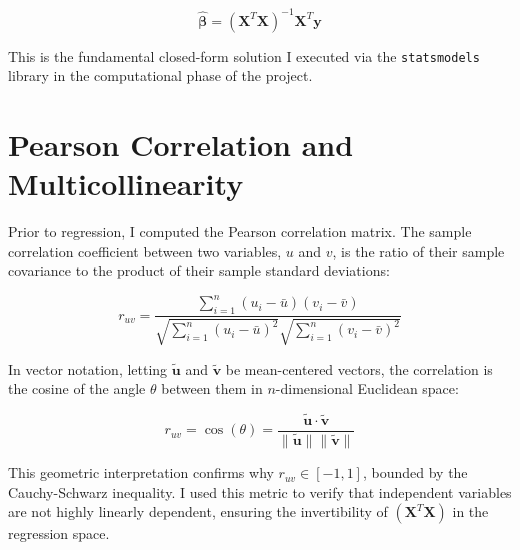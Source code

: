 \documentclass[11pt, a4paper]{article}
\begin{document}
                                                    \begin{equation}
                                                        \hat{\boldsymbol{\beta}} = (\mathbf{X}^T\mathbf{X})^{-1}\mathbf{X}^T\mathbf{y}
                                                        \end{equation}

                                                        This is the fundamental closed-form solution I executed via the \texttt{statsmodels} library in the computational phase of the project.

                                                        \section{Pearson Correlation and Multicollinearity}

                                                        Prior to regression, I computed the Pearson correlation matrix. The sample correlation coefficient between two variables, $u$ and $v$, is the ratio of their sample covariance to the product of their sample standard deviations:

                                                        \begin{equation}
                                                            r_{uv} = \frac{\sum_{i=1}^{n} (u_i - \bar{u})(v_i - \bar{v})}{\sqrt{\sum_{i=1}^{n} (u_i - \bar{u})^2} \sqrt{\sum_{i=1}^{n} (v_i - \bar{v})^2}}
                                                            \end{equation}

                                                            In vector notation, letting $\tilde{\mathbf{u}}$ and $\tilde{\mathbf{v}}$ be mean-centered vectors, the correlation is the cosine of the angle $\theta$ between them in $n$-dimensional Euclidean space:

                                                            \begin{equation}
                                                                r_{uv} = \cos(\theta) = \frac{\tilde{\mathbf{u}} \cdot \tilde{\mathbf{v}}}{\|\tilde{\mathbf{u}}\| \|\tilde{\mathbf{v}}\|}
                                                                \end{equation}

                                                                This geometric interpretation confirms why $r_{uv} \in [-1, 1]$, bounded by the Cauchy-Schwarz inequality. I used this metric to verify that independent variables are not highly linearly dependent, ensuring the invertibility of $(\mathbf{X}^T\mathbf{X})$ in the regression space.

                                                                
\end{document}
